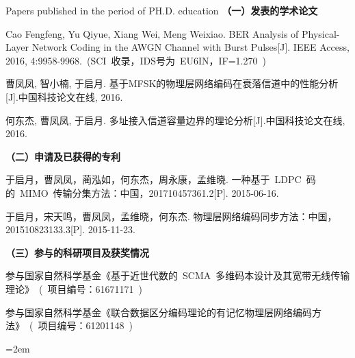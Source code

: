 
{} {Papers
published in the period of PH.D. education}
\setlength{\parindent}{0em}
\textbf{（一）发表的学术论文}
\begin{publist}
\item Cao Fengfeng, Yu Qiyue, Xiang Wei, Meng Weixiao. BER Analysis of Physical-Layer Network Coding in the AWGN Channel with Burst Pulses[J]. IEEE Access, 2016, 4:9958-9968.~(SCI~收录，IDS号为~EU6IN，IF=1.270~)
\item 曹凤凤, 智小楠, 于启月. 基于MFSK的物理层网络编码在衰落信道中的性能分析[J].中国科技论文在线, 2016.
\item 何东杰, 曹凤凤, 于启月. 多址接入信道容量边界的理论分析[J].中国科技论文在线, 2016.
\end{publist}

\textbf{（二）申请及已获得的专利}
\begin{publist}
\item 于启月，曹凤凤，蔺泓如，何东杰，周永康，孟维晓. 一种基于~LDPC~码的~MIMO~传输分集方法：中国，201710457361.2[P]. 2015-06-16.
\item 于启月，宋天鸣，曹凤凤，孟维晓，何东杰. 物理层网络编码同步方法：中国，201510823133.3[P]. 2015-11-23.
\end{publist}

\textbf{（三）参与的科研项目及获奖情况}
\begin{publist}
\item 参与国家自然科学基金《基于近世代数的~SCMA~多维码本设计及其宽带无线传输理论》~(~项目编号：61671171~)
\item 参与国家自然科学基金《联合数据区分编码理论的有记忆物理层网络编码方法》~(~项目编号：61201148~)
\end{publist}
\vfill
{}\hangindent=2em\noindent

\setlength{\parindent}{2em}
